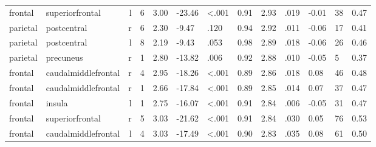 \documentclass{article}
\begin{document}
\begin{longtable}{llrR{1.3cm}R{1cm}R{1.3cm}R{1cm}R{1cm}R{1.3cm}R{1cm}R{1.8cm}R{1.3cm}R{1.8cm}}
   frontal &           superiorfrontal &    l &         6 &                  3.00 &           -23.46 &      \textless.001 &                               0.91 &                          2.93 &                            .019 &  -0.01 &     38 &      0.47 \\
  parietal &               postcentral &    r &         6 &                  2.30 &            -9.47 &               .120 &                               0.94 &                          2.92 &                            .011 &  -0.06 &     17 &      0.41 \\
  parietal &               postcentral &    l &         8 &                  2.19 &            -9.43 &               .053 &                               0.98 &                          2.89 &                            .018 &  -0.06 &     26 &      0.46 \\
  parietal &                 precuneus &    r &         1 &                  2.80 &           -13.82 &               .006 &                               0.92 &                          2.88 &                            .010 &  -0.05 &      5 &      0.37 \\
   frontal &       caudalmiddlefrontal &    r &         4 &                  2.95 &           -18.26 &      \textless.001 &                               0.89 &                          2.86 &                            .018 &   0.08 &     46 &      0.48 \\
   frontal &       caudalmiddlefrontal &    r &         1 &                  2.66 &           -17.84 &      \textless.001 &                               0.89 &                          2.85 &                            .014 &   0.07 &     37 &      0.47 \\
   frontal &                    insula &    l &         1 &                  2.75 &           -16.07 &      \textless.001 &                               0.91 &                          2.84 &                            .006 &  -0.05 &     31 &      0.47 \\
   frontal &           superiorfrontal &    r &         5 &                  3.03 &           -21.62 &      \textless.001 &                               0.91 &                          2.84 &                            .030 &   0.05 &     76 &      0.53 \\
   frontal &       caudalmiddlefrontal &    l &         4 &                  3.03 &           -17.49 &      \textless.001 &                               0.90 &                          2.83 &                            .035 &   0.08 &     61 &      0.50 \\

\end{longtable}
\end{document}
